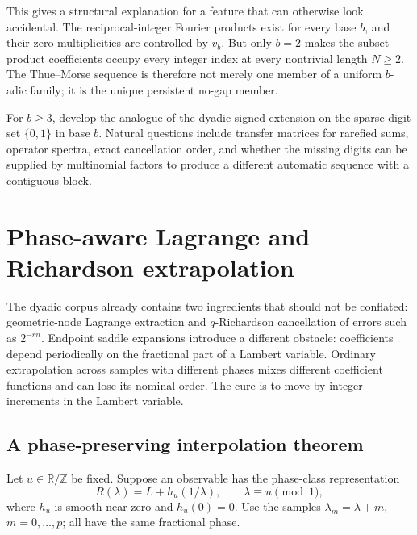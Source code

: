 \documentclass[11pt]{article}
\numberwithin{equation}{section}
\theoremstyle{definition}
\theoremstyle{remark}
\newcommand{\R}{\mathbb R}
\newcommand{\Z}{\mathbb Z}
\begin{document}
This gives a structural explanation for a feature that can otherwise look accidental.  The
reciprocal-integer Fourier products exist for every base $b$, and their zero multiplicities
are controlled by $v_b$.  But only $b=2$ makes the subset-product coefficients occupy every
integer index at every nontrivial length $N\ge2$.  The Thue--Morse sequence is therefore not
merely one member of a uniform $b$-adic family; it is the unique persistent no-gap member.

\begin{problem}
For $b\ge3$, develop the analogue of the dyadic signed extension on the sparse digit set
$\{0,1\}$ in base $b$.  Natural questions include transfer matrices for rarefied sums,
operator spectra, exact cancellation order, and whether the missing digits can be supplied by
multinomial factors to produce a different automatic sequence with a contiguous block.
\end{problem}

\section{Phase-aware Lagrange and Richardson extrapolation}
\label{p10:sec:phase}

The dyadic corpus already contains two ingredients that should not be conflated:
geometric-node Lagrange extraction and $q$-Richardson cancellation of errors such as
$2^{-rn}$.  Endpoint saddle expansions introduce a different obstacle: coefficients depend
periodically on the fractional part of a Lambert variable.  Ordinary extrapolation across
samples with different phases mixes different coefficient functions and can lose its nominal
order.  The cure is to move by integer increments in the Lambert variable.

\subsection{A phase-preserving interpolation theorem}

Let $u\in\R/\Z$ be fixed.  Suppose an observable has the phase-class representation
\begin{equation}
 R(\lambda)=L+h_u(1/\lambda),
 \qquad \lambda\equiv u\pmod1,                               \label{p10:eq:phase-model}
\end{equation}
where $h_u$ is smooth near zero and $h_u(0)=0$.  Use the samples
$\lambda_m=\lambda+m$, $m=0,\ldots,p$; all have the same fractional phase.
\end{document}
